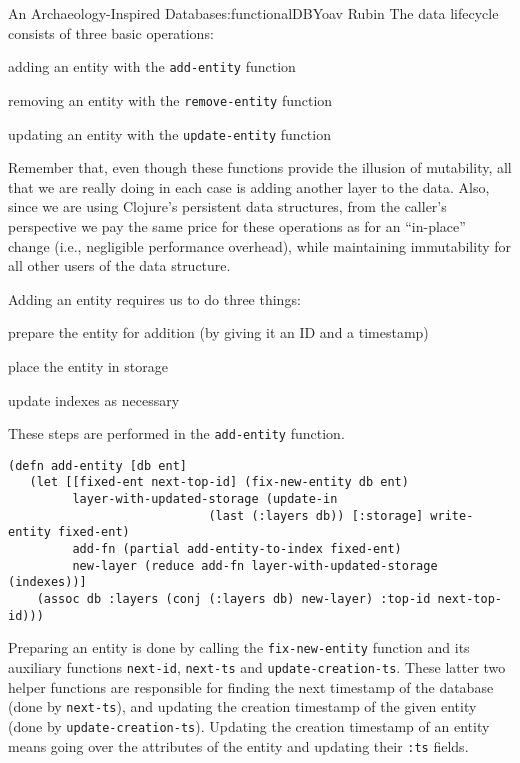 \begin{aosachapter}{An Archaeology-Inspired Database}{s:functionalDB}{Yoav Rubin}
The data lifecycle consists of three basic operations:

\begin{aosaitemize}

\item
  adding an entity with the \texttt{add-entity} function
\item
  removing an entity with the \texttt{remove-entity} function
\item
  updating an entity with the \texttt{update-entity} function
\end{aosaitemize}

Remember that, even though these functions provide the illusion of
mutability, all that we are really doing in each case is adding another
layer to the data. Also, since we are using Clojure's persistent data
structures, from the caller's perspective we pay the same price for
these operations as for an ``in-place'' change (i.e., negligible
performance overhead), while maintaining immutability for all other
users of the data structure.

\label{adding-an-entity}

Adding an entity requires us to do three things:

\begin{aosaitemize}

\item
  prepare the entity for addition (by giving it an ID and a timestamp)
\item
  place the entity in storage
\item
  update indexes as necessary
\end{aosaitemize}

These steps are performed in the \texttt{add-entity} function.

\begin{verbatim}
(defn add-entity [db ent]
   (let [[fixed-ent next-top-id] (fix-new-entity db ent)
         layer-with-updated-storage (update-in 
                            (last (:layers db)) [:storage] write-entity fixed-ent)
         add-fn (partial add-entity-to-index fixed-ent)
         new-layer (reduce add-fn layer-with-updated-storage (indexes))]
    (assoc db :layers (conj (:layers db) new-layer) :top-id next-top-id)))
\end{verbatim}

Preparing an entity is done by calling the \texttt{fix-new-entity}
function and its auxiliary functions \texttt{next-id}, \texttt{next-ts}
and \texttt{update-creation-ts}. These latter two helper functions are
responsible for finding the next timestamp of the database (done by
\texttt{next-ts}), and updating the creation timestamp of the given
entity (done by \texttt{update-creation-ts}). Updating the creation
timestamp of an entity means going over the attributes of the entity and
updating their \texttt{:ts} fields.


\end{aosachapter}
